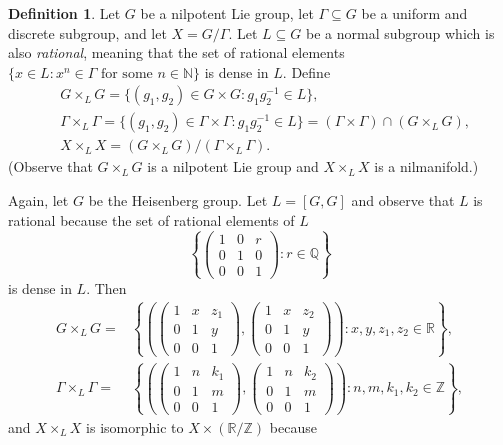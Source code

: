 \documentclass[12pt]{article}
\theoremstyle{plain} %
\theoremstyle{definition} %
\newtheorem{definition}[theorem]{Definition}
\theoremstyle{plain}
\theoremstyle{plain}
\numberwithin{equation}{section}
\newcommand{\N}{\mathbb{N}}
\newcommand{\Z}{\mathbb{Z}}
\newcommand{\R}{\mathbb{R}}
\newcommand{\Q}{\mathbb{Q}}
\renewcommand{\subset}{\subseteq}
\newcommand{\1}{\mathbbm{1}}
\begin{document}
\begin{definition}\label{def:relatively_independent_product}
Let $G$ be a nilpotent Lie group, let $\Gamma\subset G$ be a uniform and discrete subgroup, and let $X=G/\Gamma$. Let $L\subset G$ be a normal subgroup which is also \emph{rational}, meaning that the set of rational elements $\{x\in L: x^n\in \Gamma\text{ for some } n\in \N\}$ is dense in $L$. Define
\begin{align*}
    &G\times_L G = \{(g_1,g_2)\in G\times G: g_1g_2^{-1}\in L\},\\
    &\Gamma\times_L \Gamma =\{(g_1,g_2)\in \Gamma\times \Gamma: g_1g_2^{-1}\in L\}= (\Gamma\times \Gamma)\cap (G\times_L G), \\
    &X\times_L X = (G\times_L G)/(\Gamma \times_L \Gamma).
\end{align*}
(Observe that $G \times_L G$ is a nilpotent Lie group and $X \times_L X$ is a nilmanifold.)
\end{definition}

Again, let $G$ be the Heisenberg group. Let $L = [G,G]$ and observe that $L$ is rational because the set of rational elements of $L$
\begin{equation*}
         \left\{
        \begin{pmatrix}
            1 & 0 & r\\
            0 & 1 & 0\\
            0 & 0 & 1
        \end{pmatrix}:r\in \Q\right\}
    \end{equation*}
    is dense in $L$. Then 
    \begin{align*}
         G\times_L G = &\left\{\left(
        \begin{pmatrix}
            1 & x & z_1\\
            0 & 1 & y\\
            0 & 0 & 1
            \end{pmatrix},\begin{pmatrix}
            1 & x & z_2\\
            0 & 1 & y\\
            0 & 0 & 1
            \end{pmatrix}\right):x,y,z_1,z_2\in \R\right\},\\
            \Gamma\times_L \Gamma = &\left\{\left(
        \begin{pmatrix}
            1 & n & k_1\\
            0 & 1 & m\\
            0 & 0 & 1
            \end{pmatrix},\begin{pmatrix}
            1 & n & k_2\\
            0 & 1 & m\\
            0 & 0 & 1
            \end{pmatrix}\right):n,m,k_1,k_2\in \Z\right\},
    \end{align*}
    and $X\times_L X$ is isomorphic to $X\times (\R/\Z)$ because 
\end{document}
